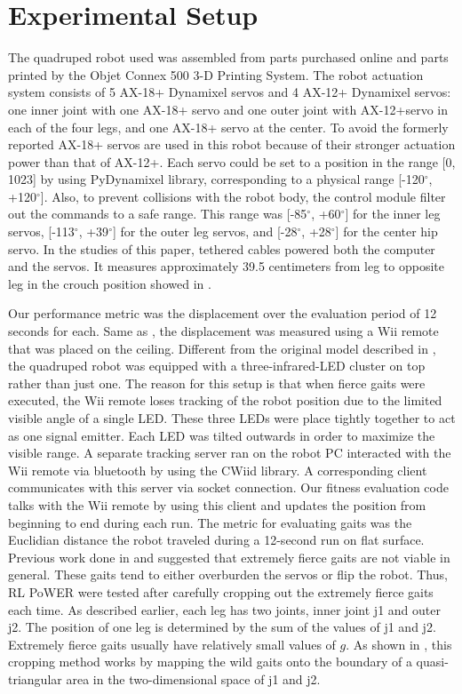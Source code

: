 \section{Experimental Setup}

The quadruped robot used was assembled from parts purchased online and
parts printed by the Objet Connex 500 3-D Printing System. The robot
actuation system consists of 5 AX-18+ Dynamixel servos and 4 AX-12+
Dynamixel servos: one inner joint with one AX-18+ servo and one outer
joint with AX-12+servo in each of the four legs, and one AX-18+ servo
at the center. To avoid the formerly reported AX-18+ servos are used
in this robot because of their stronger actuation power than that of
AX-12+. Each servo could be set to a position in the range [0, 1023]
by using PyDynamixel library, corresponding to a physical range [-120$^\circ$,
  +120$^\circ$]. Also, to prevent collisions with the robot body, the control
module filter out the commands to a safe range. This range was [-85$^\circ$,
  +60$^\circ$] for the inner leg servos, [-113$^\circ$, +39$^\circ$] for the outer leg
servos, and [-28$^\circ$, +28$^\circ$] for the center hip servo. In the studies of
this paper, tethered cables powered both the computer and the
servos. It measures approximately 39.5 centimeters from leg to
opposite leg in the crouch position showed in . 

Our performance metric was the displacement over the evaluation period of 12 seconds
for each. Same as \cite{yosinski2011evolving-robot-gaits}, the displacement was
measured using a Wii remote that was placed on the ceiling. Different
from the original model described in \cite{yosinski2011evolving-robot-gaits}, the quadruped robot was
equipped with a three-infrared-LED cluster on top rather than just
one. The reason for this setup is that when fierce gaits were
executed, the Wii remote loses tracking of the robot position due to
the limited visible angle of a single LED.  These three LEDs were
place tightly together to act as one signal emitter. Each LED was
tilted outwards in order to maximize the visible range. A
separate tracking server ran on the robot PC interacted with the Wii
remote via bluetooth by using the CWiid library.  A corresponding
client communicates with this server via socket connection. Our
fitness evaluation code talks with the Wii remote by using this client
and updates the position from beginning to end during each run. The
metric for evaluating gaits was the Euclidian distance the robot
traveled during a 12-second run on flat surface. Previous work done in
\cite{yosinski2011evolving-robot-gaits} and \cite{clune2009evolving-coordinated-quadruped} suggested that extremely fierce gaits are not viable in
general. These gaits tend to either overburden the servos or flip the
robot. Thus, RL PoWER were tested after carefully cropping out the
extremely fierce gaits each time. As described earlier, each leg has
two joints, inner joint j1 and outer j2. The position of one leg is
determined by the sum of the values of j1 and j2. Extremely fierce
gaits usually have relatively small values of $g$. As shown in , this cropping method works
by mapping the wild gaits onto the boundary of a quasi-triangular area in
the two-dimensional space of j1 and j2.

